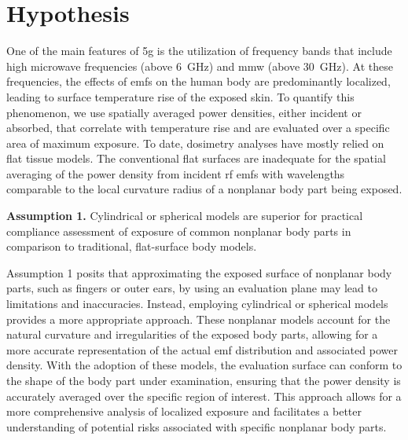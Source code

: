 \section{Hypothesis}
\label{sec:hypothesis}
One of the main features of \gls{5g} is the utilization of frequency bands that include high microwave frequencies (above \SI{6}{\GHz}) and \gls{mmw} (above \SI{30}{\GHz}).
At these frequencies, the effects of \gls{emf}s on the human body are predominantly localized, leading to surface temperature rise of the exposed skin. 
To quantify this phenomenon, we use spatially averaged power densities, either incident or absorbed, that correlate with temperature rise and are evaluated over a specific area of maximum exposure.
To date, dosimetry analyses have mostly relied on flat tissue models.
The conventional flat surfaces are inadequate for the spatial averaging of the power density from incident \gls{rf} \gls{emf}s with wavelengths comparable to the local curvature radius of a nonplanar body part being exposed.
\begin{block}
    \textbf{Assumption 1.} Cylindrical or spherical models are superior for practical compliance assessment of exposure of common nonplanar body parts in comparison to traditional, flat-surface body models.
\end{block}
Assumption 1 posits that approximating the exposed surface of nonplanar body parts, such as fingers or outer ears, by using an evaluation plane may lead to limitations and inaccuracies.
Instead, employing cylindrical or spherical models provides a more appropriate approach.
These nonplanar models account for the natural curvature and irregularities of the exposed body parts, allowing for a more accurate representation of the actual \gls{emf} distribution and associated power density.
With the adoption of these models, the evaluation surface can conform to the shape of the body part under examination, ensuring that the power density is accurately averaged over the specific region of interest.
This approach allows for a more comprehensive analysis of localized exposure and facilitates a better understanding of potential risks associated with specific nonplanar body parts.

